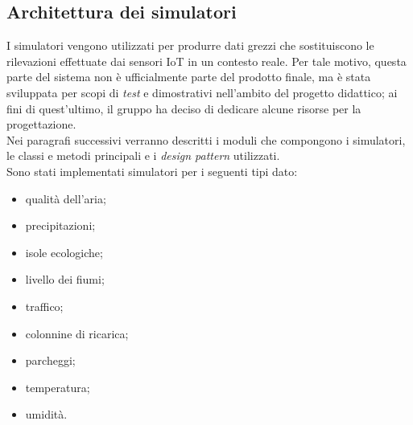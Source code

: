 \subsection{Architettura dei simulatori}
I simulatori vengono utilizzati per produrre dati grezzi che sostituiscono le rilevazioni effettuate dai sensori IoT in un contesto reale.
Per tale motivo, questa parte del sistema non è ufficialmente parte del prodotto finale, ma è stata sviluppata per scopi di \textit{test}
e dimostrativi nell'ambito del progetto didattico; ai fini di quest'ultimo, il gruppo ha deciso di dedicare alcune risorse per la progettazione.\\
Nei paragrafi successivi verranno descritti i moduli che compongono i simulatori, le classi e metodi principali e i \textit{design pattern} utilizzati.\\
Sono stati implementati simulatori per i seguenti tipi dato:
\begin{itemize}
	\item qualità dell'aria;
	\item precipitazioni;
	\item isole ecologiche;
	\item livello dei fiumi;
	\item traffico;
	\item colonnine di ricarica;
	\item parcheggi;
	\item temperatura;
	\item umidità.
\end{itemize}


